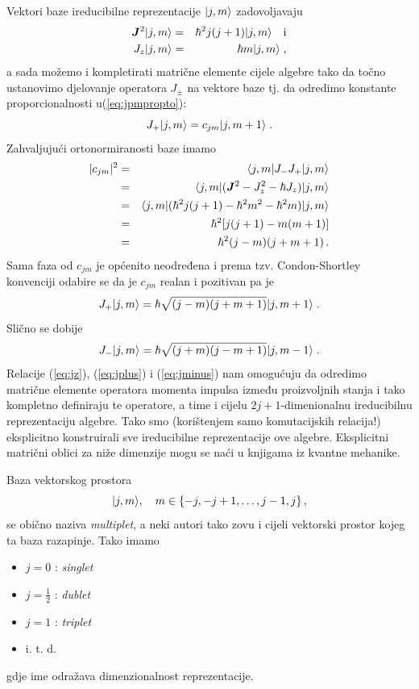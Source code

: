 Vektori baze ireducibilne reprezentacije $| j, m \rangle$ zadovoljavaju
\begin{eqnarray}
 \jsq \ket{j, m}& = & \hbar^2 j(j+1)\ket{j, m} \quad \mbox{i} \\
 J_z \ket{j, m} & =  &\hbar m \ket{j, m} \;, \label{eq:jz}
\end{eqnarray}
a sada možemo i kompletirati matrične elemente cijele algebre tako
da točno ustanovimo djelovanje operatora $J_\pm$ na vektore baze
tj. da odredimo konstante proporcionalnosti u(\ref{eq:jpmpropto}):
\begin{equation}
     J_+ | j, m \rangle = c_{jm} | j, m+1 \rangle \;.
\end{equation}
Zahvaljujući ortonormiranosti baze imamo
\begin{eqnarray*}
 |c_{jm}|^2 & = & \bra{j, m} J_- J_+ \ket{j, m} \\
            & = & \bra{j, m}(\jsq - J_{z}^2 - \hbar J_z) \ket{j, m} \\
& = & \bra{j, m}(\hbar^2 j(j+1) - \hbar^2 m^2 - \hbar^2 m) \ket{j, m}  \\
            & = & \hbar^2[j(j+1)-m(m+1)] \\
            & = & \hbar^2 (j-m)(j+m+1) \,.
\end{eqnarray*}
Sama faza od $c_{jm}$ je općenito neodređena i prema tzv. Condon-Shortley konvenciji
odabire se da je $c_{jm}$ realan i pozitivan pa je
\begin{equation}
  J_+ | j, m \rangle = \hbar \sqrt{(j-m)(j+m+1)} | j, m+1 \rangle \;.
\label{eq:jplus}
\end{equation}
Slično se dobije
\begin{equation}
  J_- | j, m \rangle = \hbar \sqrt{(j+m)(j-m+1)} | j, m-1 \rangle \;.
\label{eq:jminus}
\end{equation}
Relacije (\ref{eq:jz}), (\ref{eq:jplus}) i (\ref{eq:jminus}) 
nam omogućuju da odredimo matrične elemente operatora
momenta impulsa između proizvoljnih stanja i tako kompletno definiraju
te operatore, a time i cijelu $2j+1$-dimenionalnu ireducibilnu reprezentaciju
 algebre. Tako smo (korištenjem samo komutacijskih relacija!) eksplicitno
konstruirali sve ireducibilne reprezentacije ove algebre. Eksplicitni 
matrični oblici za niže dimenzije mogu se naći u knjigama iz kvantne
mehanike.

Baza vektorskog prostora  
\[| j, m \rangle,\quad m\in\{-j, -j+1, \ldots, j-1, j\}\,,\] 
se obično naziva \emph{multiplet}, a neki autori tako zovu i cijeli
vektorski prostor kojeg ta baza razapinje. Tako imamo
\begin{itemize}
\item  $j=0$ : \emph{singlet}
\item  $j=\frac{1}{2}$ : \emph{dublet}
\item  $j=1$ : \emph{triplet}
\item  i. t. d.
\end{itemize}
gdje ime odražava dimenzionalnost reprezentacije.

